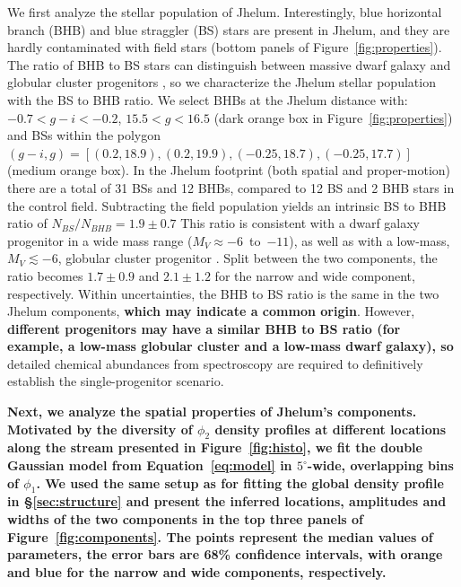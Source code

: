 \documentclass[twocolumn]{aastex62}
\newcommand{\changes}[1]{{\textbf{#1}}}
\begin{document}
We first analyze the stellar population of Jhelum.
Interestingly, blue horizontal branch (BHB) and blue straggler (BS) stars are present in Jhelum, and they are hardly contaminated with field stars (bottom panels of Figure~\ref{fig:properties}).
The ratio of BHB to BS stars can distinguish between massive dwarf galaxy and globular cluster progenitors \citep[e.g.,][]{momany2007, deason2015}, so we characterize the Jhelum stellar population with the BS to BHB ratio.
We select BHBs at the Jhelum distance with: $-0.7<g-i<-0.2$, $15.5<g<16.5$ (dark orange box in Figure~\ref{fig:properties}) and BSs within the polygon $(g-i,g) = [(0.2,18.9), (0.2, 19.9), (-0.25, 18.7), (-0.25,17.7)]$ (medium orange box).
In the Jhelum footprint (both spatial and proper-motion) there are a total of 31 BSs and 12 BHBs, compared to 12 BS and 2 BHB stars in the control field.
Subtracting the field population yields an intrinsic BS to BHB ratio of $N_{BS} / N_{BHB} = 1.9\pm 0.7$
This ratio is consistent with a dwarf galaxy progenitor in a wide mass range ($M_V\approx-6$~to~$-11$), as well as with a low-mass, $M_V\lesssim-6$, globular cluster progenitor \citep{deason2015}.
Split between the two components, the ratio becomes $1.7\pm0.9$ and $2.1\pm1.2$ for the narrow and wide component, respectively.
Within uncertainties, the BHB to BS ratio is the same in the two Jhelum components, \changes{which may indicate a common origin}.
However, \changes{different progenitors may have a similar BHB to BS ratio (for example, a low-mass globular cluster and a low-mass dwarf galaxy), so} detailed chemical abundances from spectroscopy are required to definitively establish the single-progenitor scenario.

\changes{
Next, we analyze the spatial properties of Jhelum's components.
Motivated by the diversity of $\phi_2$ density profiles at different locations along the stream presented in Figure~\ref{fig:histo}, we fit the double Gaussian model from Equation~\ref{eq:model} in $5^\circ$-wide, overlapping bins of $\phi_1$.
We used the same setup as for fitting the global density profile in \S\ref{sec:structure} and present the inferred locations, amplitudes and widths of the two components in the top three panels of Figure~\ref{fig:components}.
The points represent the median values of parameters, the error bars are 68\% confidence intervals, with orange and blue for the narrow and wide components, respectively.
}

\end{document}
